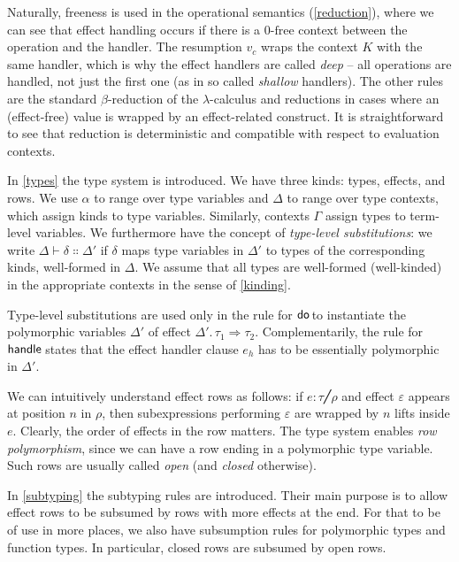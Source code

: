 \documentclass[a4paper, 12pt]{report}
\newcommand{\keyword}[1]{\textsf{\textup{#1}}}
\newcommand{\Do}{\keyword{do}\;}
\newcommand{\Handle}{\keyword{handle}\;}
\newcommand{\Free}{\textrm{-}\mathrm{free}}
\newcommand{\+}{\enspace}
\begin{document}
Naturally, freeness is used in the operational semantics (\cref{reduction}),
where we can see that effect handling occurs if there
is a $0\Free$ context between the operation and the handler.
The resumption $v_c$ wraps the context $K$
with the same handler, which is why the effect handlers are called {\em deep}
– all operations are handled, not just the first one (as in so called {\em shallow} handlers).
The other rules are the standard $β$-reduction of the $λ$-calculus
and reductions in cases where an (effect-free) value is wrapped by an effect-related construct.
It is straightforward to see that reduction is deterministic
and compatible with respect to evaluation contexts.

In \cref{types} the type system is introduced.
We have three kinds: types, effects, and rows.
We use $α$ to range over type variables and
$Δ$ to range over type contexts, which assign kinds to type variables.
Similarly, contexts $Γ$ assign types to term-level variables.
We furthermore have the concept of {\em type-level substitutions}:
we write $Δ ⊢ δ ∷ Δ'$ if $δ$ maps type variables in $Δ'$ to types of the corresponding kinds,
well-formed in $Δ$.
We assume that all types are well-formed (well-kinded) in the appropriate contexts in the sense of \cref{kinding}.


Type-level substitutions are used only in the rule for $\Do\!\!\!$
to instantiate the polymorphic variables $Δ'$ of effect $Δ'.\,τ_1 \Rightarrow τ_2$.
Complementarily, the rule for $\Handle\!\!$ states that the effect handler clause $e_h$
has to be essentially polymorphic in $Δ'$.

We can intuitively understand effect rows as follows:
 if $e : τ ╱ ρ$ and effect $ε$ appears at position $n$ in $ρ$, then
subexpressions performing $ε$ are wrapped by $n$ lifts inside $e$.
Clearly, the order of effects in the row matters.
The type system enables {\em row polymorphism}, %
since we can have a row ending in a polymorphic type variable.
Such rows are usually called {\em open} (and {\em closed} otherwise). %

In \cref{subtyping} the subtyping rules are introduced.
Their main purpose is to allow
effect rows to be subsumed by rows with more effects at the end.
For that to be of use in more places,
we also have subsumption rules for polymorphic types and function types. %
In particular, closed rows are subsumed by open rows. %

\end{document}
